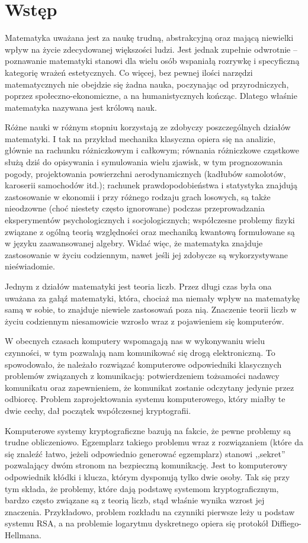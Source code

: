 \chapter*{Wstęp}

Matematyka uważana jest za naukę trudną, abstrakcyjną
oraz mającą niewielki wpływ na życie zdecydowanej większości ludzi.
Jest jednak zupełnie odwrotnie --
poznawanie matematyki stanowi dla wielu osób wspaniałą rozrywkę
i specyficzną kategorię wrażeń estetycznych.
Co więcej, bez pewnej ilości narzędzi matematycznych
nie obejdzie się żadna nauka,
poczynając od przyrodniczych,
poprzez społeczno-ekonomiczne,
a na humanistycznych kończąc.
Dlatego właśnie matematyka nazywana jest królową nauk.

Różne nauki w różnym stopniu korzystają ze zdobyczy
poszczególnych działów matematyki.
I tak na przykład
mechanika klasyczna opiera się na analizie,
głównie na rachunku różniczkowym i całkowym;
równania różniczkowe cząstkowe służą dziś
do opisywania i symulowania wielu zjawisk,
w tym prognozowania pogody, projektowania powierzchni aerodynamicznych
(kadłubów samolotów, karoserii samochodów itd.);
rachunek prawdopodobieństwa i statystyka
znajdują zastosowanie w ekonomii i przy różnego rodzaju grach losowych,
są także nieodzowne (choć niestety często ignorowane)
podczas przeprowadzania eksperymentów psychologicznych i socjologicznych;
współczesne problemy fizyki
związane z ogólną teorią względności oraz mechaniką kwantową
formułowane są w języku zaawansowanej algebry.
Widać więc, że matematyka znajduje zastosowanie w życiu codziennym,
nawet jeśli jej zdobycze są wykorzystywane nieświadomie.

Jednym z działów matematyki jest teoria liczb.
Przez długi czas była ona uważana za gałąź matematyki,
która, chociaż ma niemały wpływ na matematykę samą w sobie,
to znajduje niewiele zastosowań poza nią.
Znaczenie teorii liczb w życiu codziennym
niesamowicie wzrosło wraz z pojawieniem się komputerów.

W obecnych czasach komputery wspomagają nas w wykonywaniu wielu czynności,
w tym pozwalają nam komunikować się drogą elektroniczną.
To spowodowało, że należało rozwiązać komputerowe odpowiedniki
klasycznych problemów związanych z komunikacją:
potwierdzeniem tożsamości nadawcy komunikatu
oraz zapewnieniem, że komunikat zostanie odczytany jedynie przez odbiorcę.
Problem zaprojektowania systemu komputerowego,
który miałby te dwie cechy,
dał początek współczesnej kryptografii.

Komputerowe systemy kryptograficzne bazują na fakcie,
że pewne problemy są trudne obliczeniowo.
Egzemplarz takiego problemu wraz z rozwiązaniem
(które da się znaleźć łatwo, jeżeli odpowiednio generować egzemplarz)
stanowi ,,sekret'' pozwalający dwóm stronom na bezpieczną komunikację.
Jest to komputerowy odpowiednik kłódki i klucza,
którym dysponują tylko dwie osoby.
Tak się przy tym składa,
że problemy, które dają podstawę systemom kryptograficznym,
bardzo często związane są z teorią liczb,
stąd właśnie wynika wzrost jej znaczenia.
Przykładowo, problem rozkładu na czynniki pierwsze leży u podstaw systemu RSA,
a na problemie logarytmu dyskretnego opiera się protokół Diffiego-Hellmana.


